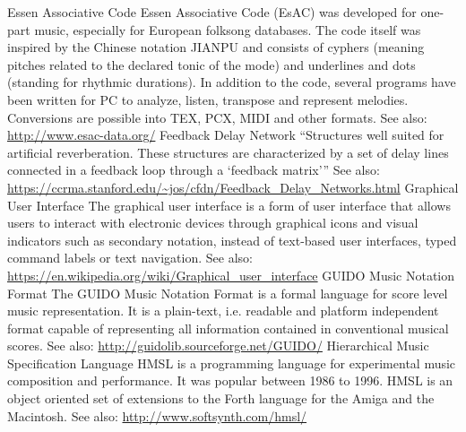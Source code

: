 	{Essen Associative Code}
	{Essen Associative Code (EsAC) was developed for one-part music, especially for European folksong databases. The code itself was inspired by the Chinese notation JIANPU and consists of cyphers (meaning pitches related to the declared tonic of the mode) and underlines and dots (standing for rhythmic durations). In addition to the code, several programs have been written for PC to analyze, listen, transpose and represent melodies.
Conversions are possible into TEX, PCX, MIDI and other formats. See also: \url{http://www.esac-data.org/}}
	{Feedback Delay Network}
	{``Structures well suited for artificial reverberation. These structures are characterized by a set of delay lines connected in a feedback loop through a `feedback matrix''' See also: \url{https://ccrma.stanford.edu/~jos/cfdn/Feedback_Delay_Networks.html} \parencites{icmc/bbp2372.1994.099}{icmc/bbp2372.1994.098}{icmc/bbp2372.2015.048}{icmc/bbp23722015.054}}
	{Graphical User Interface}
	{The graphical user interface is a form of user interface that allows users to interact with electronic devices through graphical icons and visual indicators such as secondary notation, instead of text-based user interfaces, typed command labels or text navigation. See also: \url{https://en.wikipedia.org/wiki/Graphical_user_interface}}
	{GUIDO Music Notation Format}
	{The GUIDO Music Notation Format is a formal language for score level music representation. It is a plain-text, i.e. readable and platform independent format capable of representing all information contained in conventional musical scores. See also: \url{http://guidolib.sourceforge.net/GUIDO/}}
	{Hierarchical Music Specification Language}
	{HMSL is a programming language for experimental music composition and performance. It was popular between 1986 to 1996. HMSL is an object oriented set of extensions to the Forth language for the Amiga and the Macintosh. See also: \url{http://www.softsynth.com/hmsl/}}
